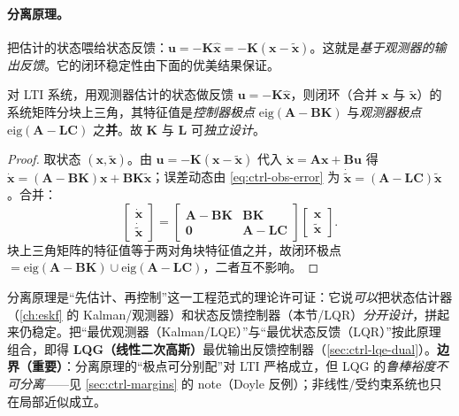 \paragraph{分离原理。}
把估计的状态喂给状态反馈：$\mathbf{u}=-\mathbf{K}\hat{\mathbf{x}}=-\mathbf{K}(\mathbf{x}-\tilde{\mathbf{x}})$。这就是\emph{基于观测器的输出反馈}。它的闭环稳定性由下面的优美结果保证。

\begin{proposition}[分离原理]
\label{prop:ctrl-separation}
对 LTI 系统，用观测器估计的状态做反馈 $\mathbf{u}=-\mathbf{K}\hat{\mathbf{x}}$，则闭环（合并 $\mathbf{x}$ 与 $\tilde{\mathbf{x}}$）的系统矩阵分块上三角，其特征值是\emph{控制器极点} $\mathrm{eig}(\mathbf{A}-\mathbf{B}\mathbf{K})$ 与\emph{观测器极点} $\mathrm{eig}(\mathbf{A}-\mathbf{L}\mathbf{C})$ 之\textbf{并}。故 $\mathbf{K}$ 与 $\mathbf{L}$ 可\emph{独立设计}\cite{astrom2008feedback}。
\end{proposition}
\begin{proof}
取状态 $(\mathbf{x},\tilde{\mathbf{x}})$。由 $\mathbf{u}=-\mathbf{K}(\mathbf{x}-\tilde{\mathbf{x}})$ 代入 $\dot{\mathbf{x}}=\mathbf{A}\mathbf{x}+\mathbf{B}\mathbf{u}$ 得 $\dot{\mathbf{x}}=(\mathbf{A}-\mathbf{B}\mathbf{K})\mathbf{x}+\mathbf{B}\mathbf{K}\tilde{\mathbf{x}}$；误差动态由 \cref{eq:ctrl-obs-error} 为 $\dot{\tilde{\mathbf{x}}}=(\mathbf{A}-\mathbf{L}\mathbf{C})\tilde{\mathbf{x}}$。合并：
\[
  \begin{bmatrix}\dot{\mathbf{x}}\\\dot{\tilde{\mathbf{x}}}\end{bmatrix}
  =\begin{bmatrix}\mathbf{A}-\mathbf{B}\mathbf{K}&\mathbf{B}\mathbf{K}\\\mathbf{0}&\mathbf{A}-\mathbf{L}\mathbf{C}\end{bmatrix}
  \begin{bmatrix}\mathbf{x}\\\tilde{\mathbf{x}}\end{bmatrix}.
\]
块上三角矩阵的特征值等于两对角块特征值之并，故闭环极点 $=\mathrm{eig}(\mathbf{A}-\mathbf{B}\mathbf{K})\cup\mathrm{eig}(\mathbf{A}-\mathbf{L}\mathbf{C})$，二者互不影响。
\end{proof}

\begin{insight}
分离原理是“先估计、再控制”这一工程范式的理论许可证：它说\emph{可以}把状态估计器（\cref{ch:eskf} 的 Kalman/观测器）和状态反馈控制器（本节/LQR）\emph{分开设计}，拼起来仍稳定。把“最优观测器（Kalman/LQE）”与“最优状态反馈（LQR）”按此原理组合，即得 \textbf{LQG（线性二次高斯）}最优输出反馈控制器（\cref{sec:ctrl-lqe-dual}）。\textbf{边界（重要）}：分离原理的“极点可分别配”对 LTI 严格成立，但 LQG 的\emph{鲁棒裕度不可分离}——见 \cref{sec:ctrl-margins} 的 note（Doyle 反例）；非线性/受约束系统也只在局部近似成立。
\end{insight}

